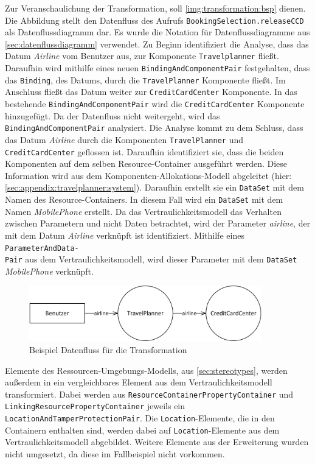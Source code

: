 Zur Veranschaulichung der Transformation, soll \autoref{img:transformation:bsp} dienen. Die Abbildung stellt den Datenfluss des Aufrufs \texttt{BookingSelection.releaseCCD} als Datenflussdiagramm dar. Es wurde die Notation für Datenflussdiagramme aus \autoref{sec:datenflussdiagramm} verwendet. Zu Beginn identifiziert die Analyse, dass das Datum \textit{Airline} vom Benutzer aus, zur Komponente \texttt{Travelplanner} fließt. Daraufhin wird mithilfe eines neuen \texttt{BindingAndComponentPair} festgehalten, dass das \texttt{Binding}, des Datums, durch die \texttt{TravelPlanner} Komponente fließt. Im Anschluss fließt das Datum weiter zur \texttt{CreditCardCenter} Komponente. In das bestehende \texttt{BindingAndComponentPair} wird die \texttt{CreditCardCenter} Komponente hinzugefügt. Da der Datenfluss nicht weitergeht, wird das \texttt{BindingAndComponentPair} analysiert. Die Analyse kommt zu dem Schluss, dass das Datum \textit{Airline} durch die Komponenten \texttt{TravelPlanner} und \texttt{CreditCardCenter} geflossen ist. Daraufhin identifiziert sie, dass die beiden Komponenten auf dem selben Resource-Container ausgeführt werden. Diese Information wird aus dem Komponenten-Allokations-Modell abgeleitet (hier: \autoref{sec:appendix:travelplanner:system}). Daraufhin erstellt sie ein \texttt{DataSet} mit dem Namen des Resource-Containers. In diesem Fall wird ein \texttt{DataSet} mit dem Namen \textit{MobilePhone} erstellt. Da das Vertraulichkeitsmodell das Verhalten zwischen Parametern und nicht Daten betrachtet, wird der Parameter \textit{airline}, der mit dem Datum \textit{Airline} verknüpft ist identifiziert. Mithilfe eines \texttt{ParameterAndData-\\Pair} aus dem Vertraulichkeitsmodell, wird dieser Parameter mit dem \texttt{DataSet} \textit{MobilePhone} verknüpft. \par
\begin{figure}[h]
	\centering
  	\includegraphics[width=0.9\textwidth]{images/transformation_bsp.png}
	\caption{Beispiel Datenfluss für die Transformation}
	\label{img:transformation:bsp}
\end{figure}

Elemente des Ressourcen-Umgebungs-Modells, aus \autoref{sec:stereotypes}, werden außerdem in ein vergleichbares Element aus dem Vertraulichkeitsmodell transformiert. Dabei werden aus \texttt{ResourceContainerPropertyContainer} und \texttt{LinkingResourcePropertyContainer} jeweils ein \texttt{LocationAndTamperProtectionPair}. Die \texttt{Location}-Elemente, die in den Containern enthalten sind, werden dabei auf \texttt{Location}-Elemente aus dem Vertraulichkeitsmodell abgebildet. Weitere Elemente aus der Erweiterung wurden nicht umgesetzt, da diese im Fallbeispiel nicht vorkommen.


